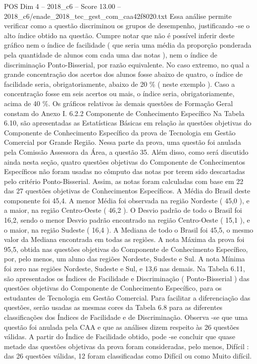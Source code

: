 \begin{textsample}{POS Dim 4 – 2018\_c6 – Score 13.00 – 2018\_c6/enade\_2018\_tec\_gest\_com\_caa42f8020.txt}
Essa análise permite verificar como a questão discriminou os grupos de desempenho, justificando -se o alto índice obtido na questão.
Cumpre notar que não é possível inferir deste gráfico nem o índice de facilidade ( que seria uma média da proporção ponderada pela quantidade de alunos com cada uma das notas ), nem o índice de discriminação Ponto-Bisserial, por razão equivalente.
No caso extremo, no qual a grande concentração dos acertos dos alunos fosse abaixo de quatro, o índice de facilidade seria, obrigatoriamente, abaixo de 20 \% ( neste exemplo ).
Caso a concentração fosse em seis acertos ou mais, o índice seria, obrigatoriamente, acima de 40 \%.
Os gráficos relativos às demais questões de Formação Geral constam do Anexo I. 6.2.2 Componente de Conhecimento Específico Na Tabela 6.10, são apresentadas as Estatísticas Básicas em relação às questões objetivas do Componente de Conhecimento Específico da prova de Tecnologia em Gestão Comercial por Grande Região.
Nessa parte da prova, uma questão foi anulada pela Comissão Assessora da Área, a questão 35.
Além disso, como será discutido ainda nesta seção, quatro questões objetivas do Componente de Conhecimentos Específicos não foram usadas no cômputo das notas por terem sido descartadas pelo critério Ponto-Bisserial.
Assim, as notas foram calculadas com base em 22 das 27 questões objetivas de Conhecimentos Específicos.
A Média do Brasil deste componente foi 45,4.
A menor Média foi observada na região Nordeste ( 45,0 ), e a maior, na região Centro-Oeste ( 46,2 ).
O Desvio padrão de todo o Brasil foi 16,2, sendo o menor Desvio padrão encontrado na região Centro-Oeste ( 15,1 ), e o maior, na região Sudeste ( 16,4 ).
A Mediana de todo o Brasil foi 45,5, o mesmo valor da Mediana encontrada em todas as regiões.
A nota Máxima da prova foi 95,5, obtida nas questões objetivas do Componente de Conhecimento Específico, por, pelo menos, um aluno das regiões Nordeste, Sudeste e Sul.
A nota Mínima foi zero nas regiões Nordeste, Sudeste e Sul, e 13,6 nas demais.
Na Tabela 6.11, são apresentados os Índices de Facilidade e Discriminação ( Ponto-Bisserial ) das questões objetivas do Componente de Conhecimento Específico, para os estudantes de Tecnologia em Gestão Comercial.
Para facilitar a diferenciação das questões, serão usadas as mesmas cores da Tabela 6.8 para as diferentes classificações dos Índices de Facilidade e de Discriminação.
Observa -se que uma questão foi anulada pela CAA e que as análises dizem respeito às 26 questões válidas.
A partir do Índice de Facilidade obtido, pode -se concluir que quase metade das questões objetivas da prova foram consideradas, pelo menos, Difícil : das 26 questões válidas, 12 foram classificadas como Difícil ou como Muito difícil.

\end{textsample}

